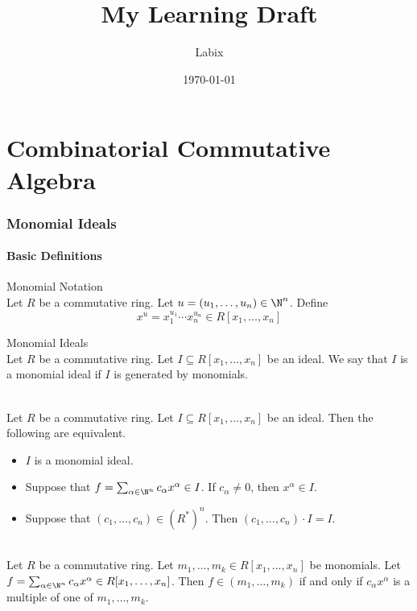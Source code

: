 \documentclass[a4paper]{article}
\title{My Learning Draft}
\author{Labix}
\date{\today}
\begin{document}
\maketitle

\pagebreak
\tableofcontents

\pagebreak
\part{Combinatorial Commutative Algebra}
\section{Monomial Ideals}
\subsection{Basic Definitions}
\begin{defn}{Monomial Notation}{}\\
Let $R$ be a commutative ring. Let $u=(u_1,\dots,u_n)\in\N^n$. Define $$x^u=x_1^{u_1}\cdots x_n^{u_n}\in R[x_1,\dots,x_n]$$
\end{defn}

\begin{defn}{Monomial Ideals}{}\\
Let $R$ be a commutative ring. Let $I\subseteq R[x_1,\dots,x_n]$ be an ideal. We say that $I$ is a monomial ideal if $I$ is generated by monomials. 
\end{defn}

\begin{prp}{}{}\\
Let $R$ be a commutative ring. Let $I\subseteq R[x_1,\dots,x_n]$ be an ideal. Then the following are equivalent. 
\begin{itemize}
\item $I$ is a monomial ideal. 
\item Suppose that $f=\sum_{\alpha\in\N^n}c_\alpha x^\alpha\in I$. If $c_\alpha\neq 0$, then $x^\alpha\in I$. 
\item Suppose that $(c_1,\dots,c_n)\in(R^\ast)^n$. Then $(c_1,\dots,c_n)\cdot I=I$. 
\end{itemize}
\end{prp}

\begin{prp}{}{}\\
Let $R$ be a commutative ring. Let $m_1,\dots,m_k\in R[x_1,\dots,x_n]$ be monomials. Let $f=\sum_{\alpha\in\N^n}c_\alpha x^\alpha\in R[x_1,\dots,x_n]$. Then $f\in(m_1,\dots,m_k)$ if and only if $c_\alpha x^\alpha$ is a multiple of one of $m_1,\dots,m_k$. 
\end{prp}
\end{document}
